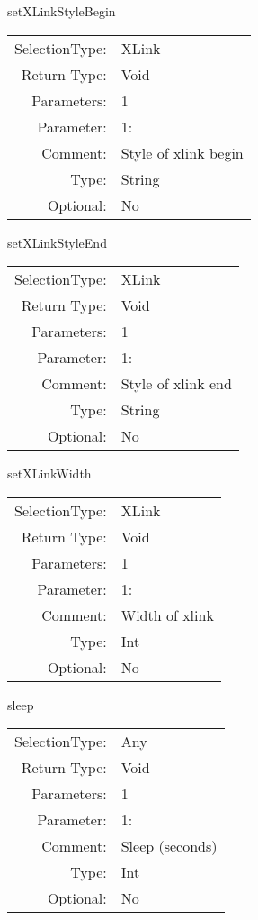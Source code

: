 \item setXLinkStyleBegin\\
\begin{tabular}{rl}
  SelectionType: & XLink\\
    Return Type: & Void\\
     Parameters: & 1\\
   Parameter: &  1:\\
        Comment: & Style of xlink begin\\
           Type: & String\\
       Optional: &  No\\
\end{tabular}

\item setXLinkStyleEnd\\
\begin{tabular}{rl}
  SelectionType: & XLink\\
    Return Type: & Void\\
     Parameters: & 1\\
   Parameter: &  1:\\
        Comment: & Style of xlink end\\
           Type: & String\\
       Optional: &  No\\
\end{tabular}

\item setXLinkWidth\\
\begin{tabular}{rl}
  SelectionType: & XLink\\
    Return Type: & Void\\
     Parameters: & 1\\
   Parameter: &  1:\\
        Comment: & Width of xlink\\
           Type: & Int\\
       Optional: &  No\\
\end{tabular}

\item sleep\\
\begin{tabular}{rl}
  SelectionType: & Any\\
    Return Type: & Void\\
     Parameters: & 1\\
   Parameter: &  1:\\
        Comment: & Sleep (seconds)\\
           Type: & Int\\
       Optional: &  No\\
\end{tabular}

